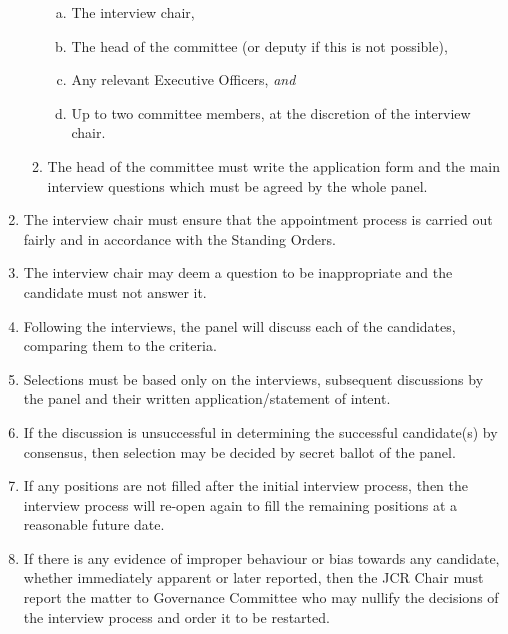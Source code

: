 \documentclass[12pt]{article}
\begin{document}
\begin{enumerate}
\begin{enumerate}
\begin{enumerate}[(a)]
            \item The interview chair,
            \item The head of the committee (or deputy if this is not possible),
            \item Any relevant Executive Officers, \emph{and}
            \item Up to two committee members, at the discretion of the interview chair.
        \end{enumerate}
        \item The head of the committee must write the application form and the main interview questions which must be agreed by the whole panel.
    \end{enumerate}
    \item The interview chair must ensure that the appointment process is carried out fairly and in accordance with the Standing Orders.
    \item The interview chair may deem a question to be inappropriate and the candidate must not answer it.
    \item Following the interviews, the panel will discuss each of the candidates, comparing them to the criteria.
    \item Selections must be based only on the interviews, subsequent discussions by the panel and their written application/statement of intent.
    \item If the discussion is unsuccessful in determining the successful candidate(s) by consensus, then selection may be decided by secret ballot of the panel.
    \item If any positions are not filled after the initial interview process, then the interview process will re-open again to fill the remaining positions at a reasonable future date.
    \item If there is any evidence of improper behaviour or bias towards any candidate, whether immediately apparent or later reported, then the JCR Chair must report the matter to Governance Committee who may nullify the decisions of the interview process and order it to be restarted.
\end{enumerate}
\newpage
\end{document}
